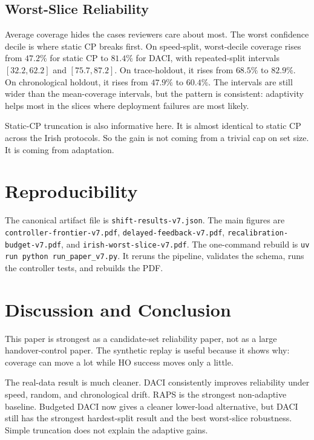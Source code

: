 \documentclass[conference]{IEEEtran}
\begin{document}
\subsection{Worst-Slice Reliability}

Average coverage hides the cases reviewers care about most. The worst confidence decile is where static CP breaks first. On speed-split, worst-decile coverage rises from $47.2\%$ for static CP to $81.4\%$ for DACI, with repeated-split intervals $[32.2,62.2]$ and $[75.7,87.2]$. On trace-holdout, it rises from $68.5\%$ to $82.9\%$. On chronological holdout, it rises from $47.9\%$ to $60.4\%$. The intervals are still wider than the mean-coverage intervals, but the pattern is consistent: adaptivity helps most in the slices where deployment failures are most likely.

Static-CP truncation is also informative here. It is almost identical to static CP across the Irish protocols. So the gain is not coming from a trivial cap on set size. It is coming from adaptation.

\section{Reproducibility}

The canonical artifact file is \texttt{shift-results-v7.json}. The main figures are \texttt{controller-frontier-v7.pdf}, \texttt{delayed-feedback-v7.pdf}, \texttt{recalibration-budget-v7.pdf}, and \texttt{irish-worst-slice-v7.pdf}. The one-command rebuild is \texttt{uv run python run\_paper\_v7.py}. It reruns the pipeline, validates the schema, runs the controller tests, and rebuilds the PDF.

\section{Discussion and Conclusion}

This paper is strongest as a candidate-set reliability paper, not as a large handover-control paper. The synthetic replay is useful because it shows why: coverage can move a lot while HO success moves only a little.

The real-data result is much cleaner. DACI consistently improves reliability under speed, random, and chronological drift. RAPS is the strongest non-adaptive baseline. Budgeted DACI now gives a cleaner lower-load alternative, but DACI still has the strongest hardest-split result and the best worst-slice robustness. Simple truncation does not explain the adaptive gains.
\end{document}
